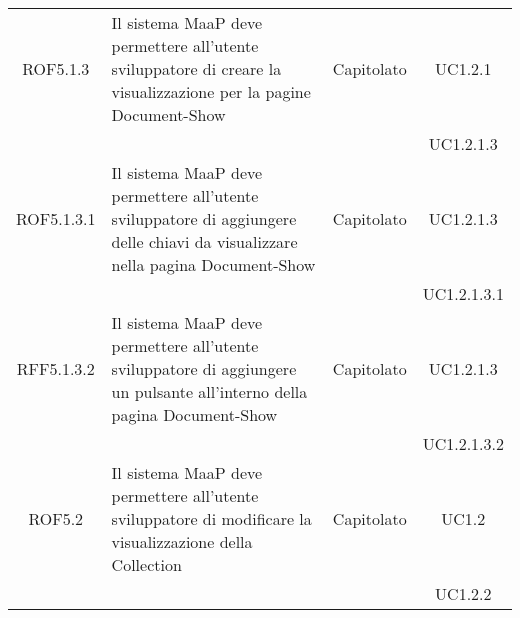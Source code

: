 \begin{longtable}{|c|p{6cm}|c|c|}
ROF5.1.3
& Il sistema MaaP deve permettere all'utente sviluppatore di creare la visualizzazione per la pagine Document-Show
& Capitolato
& UC1.2.1\\
& & & UC1.2.1.3
\\
\midrule
ROF5.1.3.1
& Il sistema MaaP deve permettere all'utente sviluppatore di aggiungere delle chiavi da visualizzare nella pagina Document-Show
& Capitolato
& UC1.2.1.3\\
& & & UC1.2.1.3.1
\\
\midrule
RFF5.1.3.2
& Il sistema MaaP deve permettere all'utente sviluppatore di aggiungere un pulsante all'interno della  pagina Document-Show
& Capitolato
& UC1.2.1.3\\
& & & UC1.2.1.3.2
\\
\midrule
ROF5.2
& Il sistema MaaP deve permettere all'utente sviluppatore di modificare la visualizzazione della Collection
& Capitolato
& UC1.2\\
& & & UC1.2.2
\\



\end{longtable}
